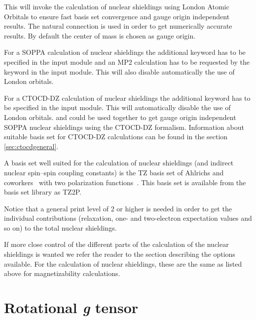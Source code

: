 This will invoke the calculation of nuclear shieldings using
London Atomic Orbitals to ensure fast basis set
convergence and gauge
origin independent results. The natural connection
\cite{joklbkrthpjtca90}
is used in order to get
numerically accurate results. By default the center of mass is chosen as gauge
origin.

For a SOPPA calculation of nuclear shieldings the additional 
keyword  has to be specified in the  input module 
and an MP2 calculation has to be requested by the keyword  in the 
 input module. This will also disable automatically
the use of London orbitals.

For a CTOCD-DZ calculation of nuclear shieldings the 
additional keyword  has to be specified in the  
input module. This will automatically disable the use of London orbitals.
 and  could be used together to get gauge origin independent
SOPPA nuclear shieldings using the CTOCD-DZ formalism.  Information about suitable basis
set for CTOCD-DZ calculations can be found in the section \ref{sec:ctocdgeneral}.

A basis set well suited for the calculation of nuclear shieldings (and
indirect nuclear spin--spin coupling constants) is the TZ basis set of
Ahlrichs and coworkers~\cite{ashhrajcp97,aschrajcp100} with two
polarization functions~\cite{thmjkrcr99}. This basis set is available
from the basis set library as TZ2P.

Notice that a general print level of 2 or higher is needed in order to
get the individual contributions (relaxation, one- and
two-electron expectation values and so on) to the total nuclear shieldings.

If more close control of the different parts of the calculation of the
nuclear shieldings is wanted we refer the reader to the section
describing the options available. For the calculation of nuclear
shieldings, these are the same as listed above for magnetizability
calculations.

\section{Rotational {\em g} tensor}\label{sec:gfac}

\begin{center}
\end{center}

